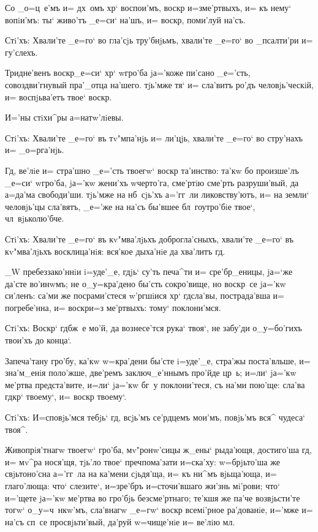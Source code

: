 Со _о=ц~е'мъ и= дх~омъ хр` воспои'мъ, воскр 
и=з\ъ ме'ртвыхъ, и= къ нему` вопiи'мъ: ты` живо'тъ _е=си` 
на'шъ, и= воскр, поми'луй на'съ.

Стi'хъ: Хвали'те _е=го` во гла'сjь тру'бнjьмъ, 
хвали'те _е=го` во _псалти'ри и= гу'слехъ.

Тридне'венъ воскр _е=си` хр` w\т гро'ба 
jа='коже пи'сано _е='сть, совоздви'гнувый пра'_отца 
на'шего. тjь'мже тя` и= сла'витъ ро'дъ человjь'ческiй, и= 
воспjьва'етъ твое` воскр.

И='ны стiхи^ры а=натw'лiевы. 

Стi'хъ: Хвали'те _е=го` въ тv"мпа'нjь и= ли'цjь, 
хвали'те _е=го` во стру'нахъ и= _о=рга'нjь.

Гд, ве'лiе и= стра'шно _е='сть твоегw` воскр 
та'инство: та'кw бо произше'лъ _е=си` w\т гро'ба, jа='кw 
жени'хъ w\т черто'га, сме'ртiю сме'рть разруши'вый, да 
а=да'ма свободи'ши. тjь'мже на нб~сjь'хъ а='гг~ли 
ликовству'ютъ, и= на земли` человjь'цы сла'вятъ, _е='же 
на на'съ бы'вшее бл~гоутро'бiе твое`, чл~вjьколю'бче.

Стi'хъ: Хвали'те _е=го` въ кv"мва'лjьхъ 
доброгла'сныхъ, хвали'те _е=го` въ кv"мва'лjьхъ 
восклица'нiя: вся'кое дыха'нiе да хва'литъ гд.

_W пребеззако'ннiи i=уде'_е, гдjь` су'ть печа^ти и= 
сре'бр_еницы, jа=`же да'сте во'инwмъ; не о_у=кра'дено 
бы'сть сокро'вище, но воскр~се jа='кw си'ленъ: са'ми же 
посрами'стеся w'ргшiися хр` гд сла'вы, 
пострада'вша и= погребе'нна, и= воскр и=з\ъ 
ме'ртвыхъ: тому` поклони'мся.

Стi'хъ: Воскр` гд бж~е мо'й, да вознесе'тся 
рука` твоя`, не забу'ди о_у=бо'гихъ твои'хъ до конца`.

Запеча'тану гро'бу, ка'кw w=кра'дени бы'сте i=уде'_е, 
стра'жы поста'вльше, и= зна'м_енiя поло'жше, две'ремъ 
заключ_е'ннымъ про'йде цр~ь; и=ли` jа='кw ме'ртва 
предста'вите, и=ли` jа='кw бг~у поклони'теся, съ на'ми 
пою'ще: сла'ва гд кр` твоему`, и= воскр 
твоему`.

Стi'хъ: И=сповjь'мся тебjь` гд, всjь'мъ се'рдцемъ 
мои'мъ, повjь'мъ вся^ чудеса` твоя^.

Живопрiя'тнагw твоегw` гро'ба, мv"ронw'сицы ж_ены` 
рыда'ющя, достиго'ша гд, и= мv^ра нося'щя, тjь'ло 
твое` преч пома'зати и=ска'ху: w=брjьто'ша же 
свjьтоно'сна а='гг~ла на ка'мени сjьдя'ща, и= къ ни^мъ 
вjьща'юща, и= глаго'люща: что` слезите`, и=з\ъ ре'бръ 
и=сточи'вшаго жи'знь мi'рови; что` и='щете jа='кw ме'ртва 
во гро'бjь безсме'ртнаго; те'кшя же па'че возвjьсти'те 
тогw` о_у=ч~нкw'мъ, сла'внагw _е=гw` воскр 
всемi'рное ра'дованiе, и='мже и= на'съ сп~се 
просвjьти'вый, да'руй w=чище'нiе и= ве'лiю мл. 

